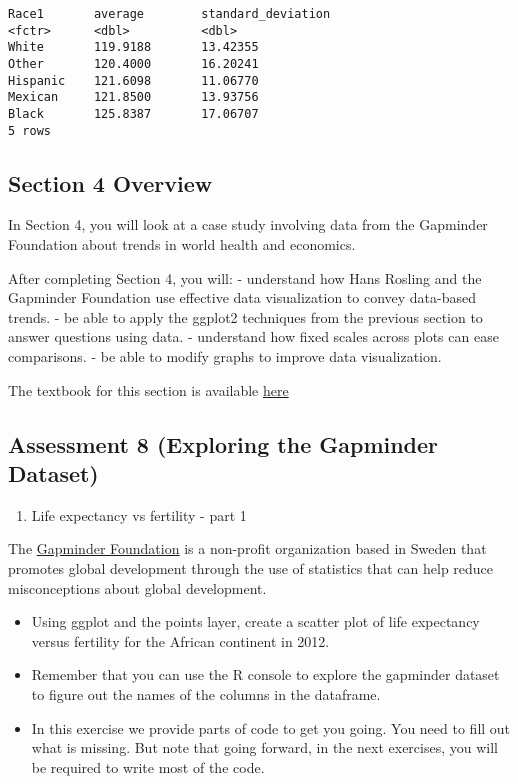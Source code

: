 \documentclass[]{article}
\providecommand{\tightlist}{%
  \setlength{\itemsep}{0pt}\setlength{\parskip}{0pt}}
\begin{document}
\begin{verbatim}
Race1       average        standard_deviation
<fctr>      <dbl>          <dbl>
White       119.9188       13.42355
Other       120.4000       16.20241
Hispanic    121.6098       11.06770
Mexican     121.8500       13.93756
Black       125.8387       17.06707
5 rows
\end{verbatim}

\hypertarget{section-4-overview}{%
\subsection{Section 4 Overview}\label{section-4-overview}}

In Section 4, you will look at a case study involving data from the
Gapminder Foundation about trends in world health and economics.

After completing Section 4, you will: - understand how Hans Rosling and
the Gapminder Foundation use effective data visualization to convey
data-based trends. - be able to apply the ggplot2 techniques from the
previous section to answer questions using data. - understand how fixed
scales across plots can ease comparisons. - be able to modify graphs to
improve data visualization.

The textbook for this section is available
\href{https://rafalab.github.io/dsbook/gapminder.html\#case-study-new-insights-on-poverty}{here}

\hypertarget{assessment-8-exploring-the-gapminder-dataset}{%
\subsection{Assessment 8 (Exploring the Gapminder
Dataset)}\label{assessment-8-exploring-the-gapminder-dataset}}

\begin{enumerate}
\def\labelenumi{\arabic{enumi}.}
\tightlist
\item
  Life expectancy vs fertility - part 1
\end{enumerate}

The \href{https://www.gapminder.org/}{Gapminder Foundation} is a
non-profit organization based in Sweden that promotes global development
through the use of statistics that can help reduce misconceptions about
global development.

\begin{itemize}
\tightlist
\item
  Using ggplot and the points layer, create a scatter plot of life
  expectancy versus fertility for the African continent in 2012.
\item
  Remember that you can use the R console to explore the gapminder
  dataset to figure out the names of the columns in the dataframe.
\item
  In this exercise we provide parts of code to get you going. You need
  to fill out what is missing. But note that going forward, in the next
  exercises, you will be required to write most of the code.
\end{itemize}
\end{document}
